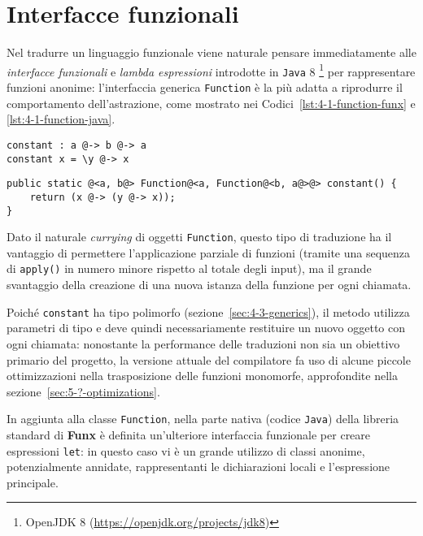 \section{Interfacce funzionali}
\label{sec:4-1-functional-interfaces}

Nel tradurre un linguaggio funzionale viene naturale pensare immediatamente alle \textit{interfacce funzionali} e \textit{lambda espressioni}
introdotte in \texttt{Java} 8%
\footnote{OpenJDK 8 (\url{https://openjdk.org/projects/jdk8})}
per rappresentare funzioni anonime: l'interfaccia generica \texttt{Function} è la più adatta a riprodurre
il comportamento dell'astrazione, come mostrato nei Codici~\ref{lst:4-1-function-funx} e \ref{lst:4-1-function-java}.

\vspace{4mm}
\begin{lstlisting}[caption={Semplice funzione in \textbf{Funx}}, style=funxCode, label={lst:4-1-function-funx}]
constant : a @-> b @-> a
constant x = \y @-> x
\end{lstlisting}
\vspace{4mm}
\begin{lstlisting}[caption={Corrispondente metodo in \texttt{Java}}, style=javaCode, label={lst:4-1-function-java}]
public static @<a, b@> Function@<a, Function@<b, a@>@> constant() {
    return (x @-> (y @-> x));
}
\end{lstlisting}
\vspace{4mm}

\noindent Dato il naturale \textit{currying} di oggetti \texttt{Function}, questo tipo di traduzione ha il vantaggio
di permettere l'applicazione parziale di funzioni (tramite una sequenza di \texttt{apply()} in numero minore rispetto al totale degli input),
ma il grande svantaggio della creazione di una nuova istanza della funzione per ogni chiamata.


Poiché \texttt{constant} ha tipo polimorfo (sezione~\ref{sec:4-3-generics}), il metodo utilizza parametri di tipo
e deve quindi necessariamente restituire un nuovo oggetto con ogni chiamata:
nonostante la performance delle traduzioni non sia un obiettivo primario del progetto, la versione attuale
del compilatore fa uso di alcune piccole ottimizzazioni nella trasposizione delle funzioni monomorfe,
approfondite nella sezione~\ref{sec:5-?-optimizations}.

\newpage

\noindent In aggiunta alla classe \texttt{Function}, nella parte nativa (codice \texttt{Java}) della libreria standard
di \textbf{Funx} è definita un'ulteriore interfaccia funzionale per creare espressioni \texttt{let}:
in questo caso vi è un grande utilizzo di classi anonime, potenzialmente annidate,
rappresentanti le dichiarazioni locali e l'espressione principale.

